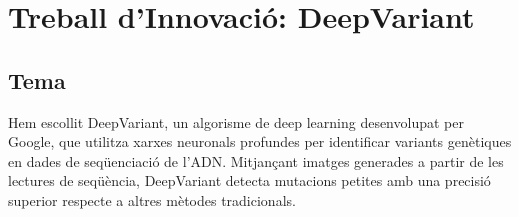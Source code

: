 \documentclass[a4paper]{article}
\begin{document}
	
	
	
	\newpage
	\section{Treball d'Innovació: DeepVariant}
	
	\subsection{Tema}
	Hem escollit DeepVariant, un algorisme de deep learning desenvolupat per Google, que utilitza xarxes neuronals profundes per identificar variants genètiques en dades de seqüenciació de l'ADN. Mitjançant imatges generades a partir de les lectures de seqüència, DeepVariant detecta mutacions petites amb una precisió superior respecte a altres mètodes tradicionals.
	
\end{document}
